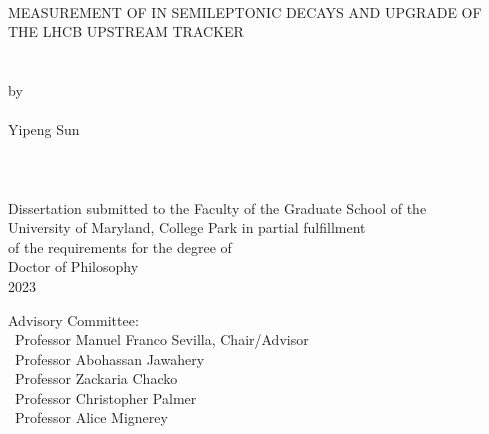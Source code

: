 \thispagestyle{empty}
\hbox{\ }
\vspace{1.5in}
\renewcommand{\baselinestretch}{1}

\begin{center}
{\large MEASUREMENT OF \RDX IN SEMILEPTONIC \B DECAYS AND
UPGRADE OF THE LHCB UPSTREAM TRACKER}  \\
\ \\
\ \\
\large{by} \\
\ \\
\large{Yipeng Sun}
\ \\
\ \\
\ \\
\ \\
\normalsize
Dissertation submitted to the Faculty of the Graduate School of the \\
University of Maryland, College Park in partial fulfillment \\
of the requirements for the degree of \\
Doctor of Philosophy \\
2023
\end{center}

\vspace{7.5em}

\noindent Advisory Committee: \\
\hbox{\ }\hspace{.5in}Professor Manuel Franco Sevilla, Chair/Advisor \\
\hbox{\ }\hspace{.5in}Professor Abohassan Jawahery \\
\hbox{\ }\hspace{.5in}Professor Zackaria Chacko \\
\hbox{\ }\hspace{.5in}Professor Christopher Palmer \\
\hbox{\ }\hspace{.5in}Professor Alice Mignerey
